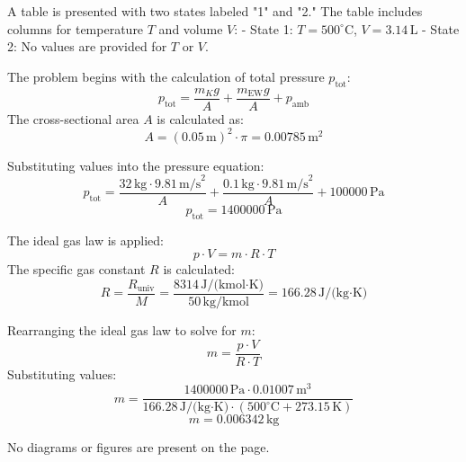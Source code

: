 A table is presented with two states labeled "1" and "2." The table includes columns for temperature \( T \) and volume \( V \):  
- State 1: \( T = 500^\circ\text{C} \), \( V = 3.14 \, \text{L} \)  
- State 2: No values are provided for \( T \) or \( V \).  

The problem begins with the calculation of total pressure \( p_{\text{tot}} \):  
\[
p_{\text{tot}} = \frac{m_K g}{A} + \frac{m_{\text{EW}} g}{A} + p_{\text{amb}}
\]  
The cross-sectional area \( A \) is calculated as:  
\[
A = (0.05 \, \text{m})^2 \cdot \pi = 0.00785 \, \text{m}^2
\]  

Substituting values into the pressure equation:  
\[
p_{\text{tot}} = \frac{32 \, \text{kg} \cdot 9.81 \, \text{m/s}^2}{A} + \frac{0.1 \, \text{kg} \cdot 9.81 \, \text{m/s}^2}{A} + 100000 \, \text{Pa}
\]  
\[
p_{\text{tot}} = 1400000 \, \text{Pa}
\]  

The ideal gas law is applied:  
\[
p \cdot V = m \cdot R \cdot T
\]  
The specific gas constant \( R \) is calculated:  
\[
R = \frac{R_{\text{univ}}}{M} = \frac{8314 \, \text{J/(kmol·K)}}{50 \, \text{kg/kmol}} = 166.28 \, \text{J/(kg·K)}
\]  

Rearranging the ideal gas law to solve for \( m \):  
\[
m = \frac{p \cdot V}{R \cdot T}
\]  
Substituting values:  
\[
m = \frac{1400000 \, \text{Pa} \cdot 0.01007 \, \text{m}^3}{166.28 \, \text{J/(kg·K)} \cdot (500^\circ\text{C} + 273.15 \, \text{K})}
\]  
\[
m = 0.006342 \, \text{kg}
\]  

No diagrams or figures are present on the page.